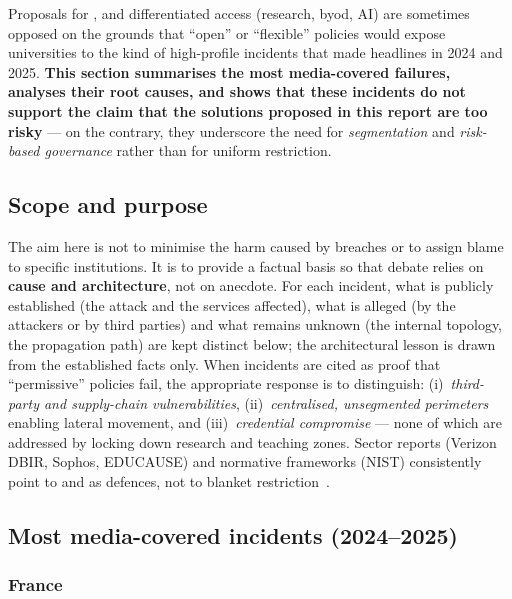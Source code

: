 Proposals for , 
and differentiated access (research, \gls{byod}, AI) are sometimes opposed on the
grounds that ``open'' or ``flexible'' policies would expose universities to
the kind of high-profile incidents that made headlines in 2024 and 2025.
\textbf{This section summarises the most media-covered failures, analyses
their root causes, and shows that these incidents do not support the claim
that the solutions proposed in this report are too risky} --- on the
contrary, they underscore the need for \emph{segmentation} and
\emph{risk-based governance} rather than for uniform restriction.

\subsection{Scope and purpose}

The aim here is not to minimise the harm caused by breaches or to assign
blame to specific institutions. It is to provide a factual basis so that
debate relies on \textbf{cause and architecture}, not on anecdote. For
each incident, what is publicly established (the attack and the services
affected), what is alleged (by the attackers or by third parties) and
what remains unknown (the internal topology, the propagation path) are
kept distinct below; the architectural lesson is drawn from the
established facts only. When
incidents are cited as proof that ``permissive'' policies fail, the
appropriate response is to distinguish: (i)~\emph{third-party and
supply-chain vulnerabilities}, (ii)~\emph{centralised, unsegmented
perimeters} enabling lateral movement, and (iii)~\emph{credential
compromise} --- none of which are addressed by locking down research and
teaching zones. Sector reports (Verizon DBIR, Sophos, EDUCAUSE) and
normative frameworks (NIST) consistently point to 
and  as defences, not to blanket restriction~\cite{verizon-dbir2024,sophos-ransomware-edu2025,educause-isg,nist-csf}.

\subsection{Most media-covered incidents (2024--2025)}

\subsubsection{France}

